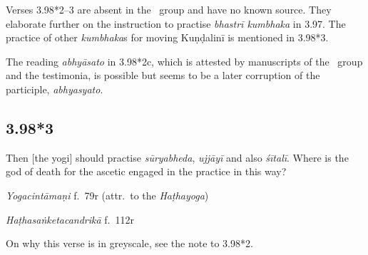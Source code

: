 \begin{ekdosis}
\begin{philcomm}[hp03_098_2]
Verses 3.98*2–3 are absent in the \textalpha\ group and have no known source. They elaborate further on the instruction to practise \emph{bhastrī kumbhaka} in 3.97. The practice of other \emph{kumbhaka}s for moving Kuṇḍalinī is mentioned in 3.98*3. 

The reading \emph{abhyāsato} in 3.98*2c, which is attested by manuscripts of the \textgamma\ group and the testimonia, is possible but seems to be a later corruption of the participle, \emph{abhyasyato}.
\end{philcomm}


\subsection*{3.98*3}
\begin{translation}[hp03_098_3]
Then [the yogi] should practise \emph{sūryabheda}, \emph{ujjāyī} and also \emph{śītalī}. Where is the god of death for the ascetic engaged in the practice in this way?
\end{translation}


\begin{testimonia}[hp03_098_3]
\emph{Yogacintāmaṇi} f.~79r (attr.~to the \emph{Haṭhayoga})
\begin{versinnote}
\end{versinnote}

\emph{Haṭhasaṅketacandrikā} f.~112r
\begin{versinnote}
\end{versinnote}
\end{testimonia}

\begin{philcomm}[hp03_098_3]
On why this verse is in greyscale, see the note to 3.98*2.



\end{philcomm}
\end{ekdosis}
